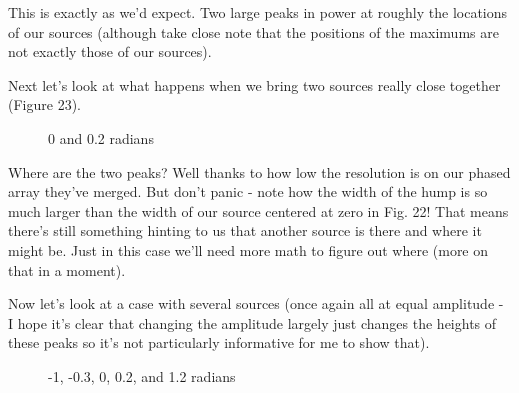 \documentclass[10pt,a4paper]{article}
\begin{document}
This is exactly as we'd expect. Two large peaks in power at roughly the locations of our sources (although take close note that the positions of the maximums are not exactly those of our sources). 

Next let's look at what happens when we bring two sources really close together (Figure 23).

\begin{figure}[!htb]
\caption{\label{fig:my-label} 0 and 0.2 radians}
\end{figure}

Where are the two peaks? Well thanks to how low the resolution is on our phased array they've merged. But don't panic - note how the width of the hump is so much larger than the width of our source centered at zero in Fig. 22! That means there's still something hinting to us that another source is there and where it might be. Just in this case we'll need more math to figure out where (more on that in a moment). 

Now let's look at a case with several sources (once again all at equal amplitude - I hope it's clear that changing the amplitude largely just changes the heights of these peaks so it's not particularly informative for me to show that). 

\begin{figure}[!htb]
\caption{\label{fig:my-label} -1, -0.3, 0, 0.2, and 1.2 radians}
\end{figure}
\end{document}
